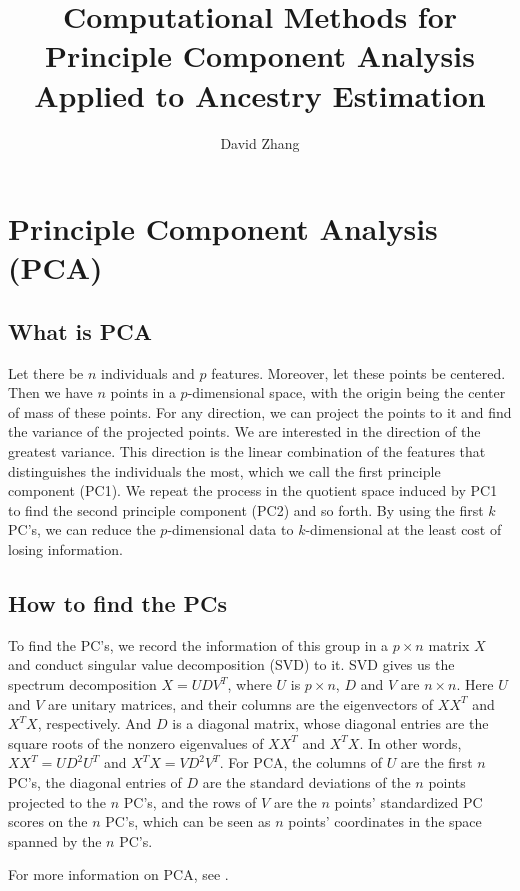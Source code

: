 \documentclass{article}[12pt]
\title{Computational Methods for Principle Component Analysis Applied to Ancestry Estimation}
\author{David Zhang}
\begin{document}
\maketitle

\section{Principle Component Analysis (PCA)}

\subsection{What is PCA}

Let there be $n$ individuals and $p$ features.
Moreover, let these points be centered.
Then we have $n$ points in a $p$-dimensional space,
with the origin being the center of mass of these points.
For any direction, we can project the points to it and find the variance of the projected points.
We are interested in the direction of the greatest variance.
This direction is the linear combination of the features that distinguishes the individuals the most,
which we call the first principle component (PC1).
We repeat the process in the quotient space induced by PC1 to find the second principle component (PC2) and so forth.
By using the first $k$ PC's, we can reduce the $p$-dimensional data to $k$-dimensional at the least cost of losing information.

\subsection{How to find the PCs}
To find the PC's, we record the information of this group in a $p \times n$ matrix $X$ and conduct singular value decomposition (SVD) to it.
SVD gives us the spectrum decomposition $X = UDV^T$, where $U$ is $p \times n$, $D$ and $V$ are $n \times n$.
Here $U$ and $V$ are unitary matrices,
and their columns are the eigenvectors of $XX^T$ and $X^T X$, respectively.
And $D$ is a diagonal matrix,
whose diagonal entries are the square roots of the nonzero eigenvalues of $X X^T$ and $X^T X$.
In other words, $X X^T = U D^2 U^T$ and $X^T X = V D^2 V^T$.
For PCA, the columns of $U$ are the first $n$ PC's,
the diagonal entries of $D$ are the standard deviations of the $n$ points projected to the $n$ PC's,
and the rows of $V$ are the $n$ points' standardized PC scores on the $n$ PC's,
which can be seen as $n$ points' coordinates in the space spanned by the $n$ PC's.

For more information on PCA, see \cite{jolliffe}.
\end{document}

